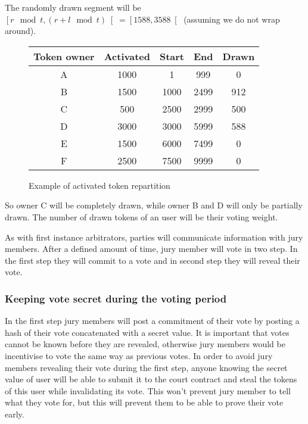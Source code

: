 \documentclass[12 pt]{article}
\begin{document}
The randomly drawn segment will be $\left[r \mod t, (r + l \mod t) \right[ = \left[1588, 3588 \right[$ (assuming we do not wrap around).

\begin{figure}[h!]
\label{repartition}
\begin{center}
   \begin{tabular}{ | c | c | c | c | c |}
     \hline
     Token owner & Activated & Start & End  & Drawn  \\ \hline
     A & 1000 & 1 & 999 & 0 \\ \hline
     B & 1500 & 1000 & 2499 & 912 \\ \hline
     C & 500 & 2500 & 2999 & 500 \\ \hline
     D & 3000 & 3000 & 5999 & 588 \\ \hline
     E & 1500 & 6000 & 7499 & 0 \\ \hline
     F & 2500 & 7500 & 9999 & 0 \\ \hline
   \end{tabular}
 \end{center}
   \caption{Example of activated token repartition}
\end{figure}

So owner C will be completely drawn, while owner B and D will only be partially drawn. The number of drawn tokens of an user will be their voting weight.

As with first instance arbitrators, parties will communicate information with jury members. After a defined amount of time, jury member will vote in two step. In the first step they will commit to a vote and in second step they will reveal their vote.

\subsubsection{Keeping vote secret during the voting period}

In the first step jury members will post a commitment of their vote by posting a hash of their vote concatenated with a secret value.
It is important that votes cannot be known before they are revealed, otherwise jury members would be incentivise to vote the same way as previous votes.
In order to avoid jury members revealing their vote during the first step, anyone knowing the secret value of user will be able to submit it to the court contract and steal the tokens of this user while invalidating its vote.
This won't prevent jury member to tell what they vote for, but this will prevent them to be able to prove their vote early.
\end{document}
